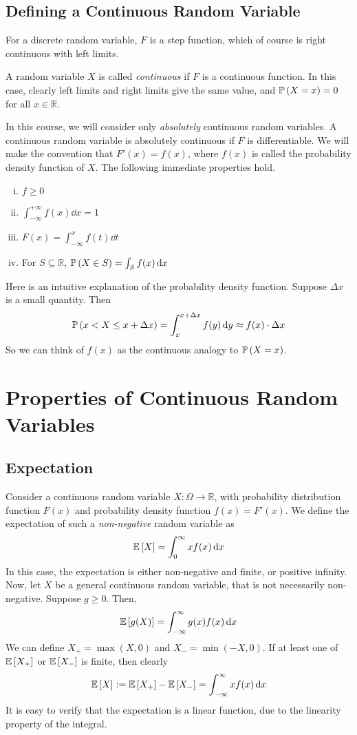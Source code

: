 \documentclass{article}
\begin{document}
\subsection{Defining a Continuous Random Variable}
For a discrete random variable, $F$ is a step function, which of course is right continuous with left limits.
\begin{definition}
    A random variable $X$ is called \textit{continuous} if $F$ is a continuous function. In this case, clearly left limits and right limits give the same value, and $\mathbb{P}\left({X = x}\right) = 0$ for all $x \in\mathbb R$.
\end{definition}
\noindent In this course, we will consider only \textit{absolutely} continuous random variables. A continuous random variable is absolutely continuous if $F$ is differentiable. We will make the convention that $F'(x) = f(x)$, where $f(x)$ is called the probability density function of $X$. The following immediate properties hold.
\begin{enumerate}[(i)]
    \item $f \geq 0$
    \item $\int_{-\infty}^{+\infty} f(x) \dd{x} = 1$
    \item $F(x) = \int_{-\infty}^x f(t) \dd{t}$
    \item For $S \subseteq \mathbb R$, $\mathbb{P}\left({X \in S}\right) = \int_S f(x) \dd{x}$
\end{enumerate}
Here is an intuitive explanation of the probability density function. Suppose $\Delta x$ is a small quantity. Then
\[ \mathbb{P}\left({x < X \leq x + \Delta x}\right) = \int_x^{x + \Delta x} f(y) \dd{y} \approx f(x) \cdot \Delta x \]
So we can think of $f(x)$ as the continuous analogy to $\mathbb{P}\left({X = x}\right)$.

\section{Properties of Continuous Random Variables}
\subsection{Expectation}
Consider a continuous random variable $X \colon \Omega \to \mathbb R$, with probability distribution function $F(x)$ and probability density function $f(x) = F'(x)$. We define the expectation of such a \textit{non-negative} random variable as
\[ \mathbb{E}\left[{X}\right] = \int_0^\infty x f(x) \dd{x} \]
In this case, the expectation is either non-negative and finite, or positive infinity. Now, let $X$ be a general continuous random variable, that is not necessarily non-negative. Suppose $g \geq 0$. Then,
\[ \mathbb{E}\left[{g(X)}\right] = \int_{-\infty}^\infty g(x) f(x) \dd{x} \]
We can define $X_+ = \max(X, 0)$ and $X_- = \min(-X, 0)$. If at least one of $\mathbb{E}\left[{X_+}\right]$ or $\mathbb{E}\left[{X_-}\right]$ is finite, then clearly
\[ \mathbb{E}\left[{X}\right] := \mathbb{E}\left[{X_+}\right] - \mathbb{E}\left[{X_-}\right] = \int_{-\infty}^\infty xf(x) \dd{x} \]
It is easy to verify that the expectation is a linear function, due to the linearity property of the integral.
\end{document}
